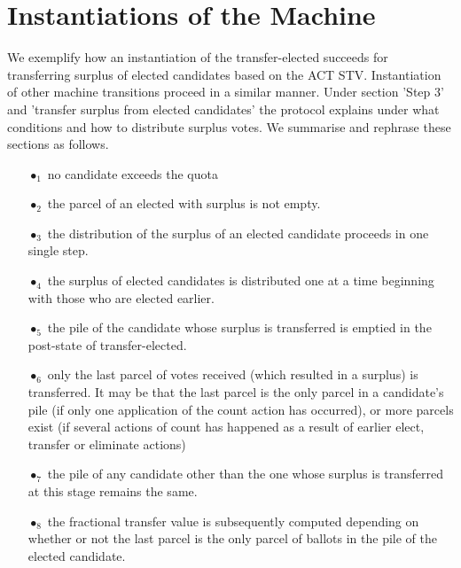 \documentclass[10pt,conference]{IEEEtran}
\begin{document}
\section{Instantiations of the Machine}\label{sec:InstMachine}
We exemplify how an instantiation of the transfer-elected succeeds for transferring surplus of elected candidates based on the ACT STV.
 Instantiation of other machine transitions proceed in a  similar manner. Under section 'Step 3' and 'transfer surplus from elected candidates' the protocol explains under what conditions and how to distribute surplus votes. We summarise and rephrase these sections as follows. 
\begin{itemize}
\item[$\bullet_{1}$] no  candidate exceeds the quota
\item[$\bullet_{2}$] the  parcel of an elected with surplus is not empty.
\item[$\bullet_{3}$] the distribution of the surplus of an elected candidate proceeds in one single step.
\item[$\bullet_{4}$] the surplus of elected candidates is distributed one at a time beginning with those who are elected earlier. 
\item[$\bullet_{5}$] the pile of the candidate whose surplus is transferred is emptied in the post-state of transfer-elected.
\item[$\bullet_{6}$] only the last parcel of votes  received (which resulted in a surplus) is transferred. It may be that the last parcel is the only parcel in a candidate's pile (if only one application of the count action has occurred), or more parcels exist (if several actions of count has happened as a result of earlier  elect, transfer or eliminate actions)
\item[$\bullet_{7}$] the pile of any candidate other than the one whose surplus is transferred at this stage remains the same.
\item[$\bullet_{8}$] the fractional transfer value is subsequently computed depending on whether or not the last parcel is the only parcel of ballots in the pile of the elected candidate. 
\end{itemize}
\end{document}

